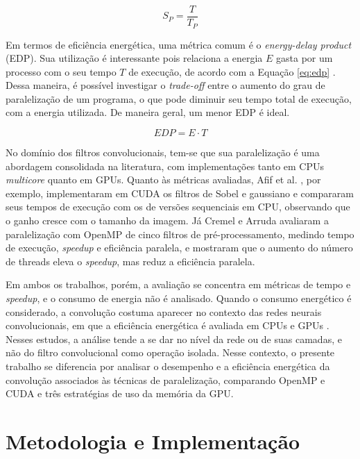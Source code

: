 \documentclass[12pt]{article}
\begin{document}
\begin{equation}
  \label{eq:speedup}
  S_P=\frac{T}{T_P}
\end{equation}

Em termos de eficiência energética, uma métrica comum é o \textit{energy-delay product} (EDP). Sua utilização é interessante pois relaciona a energia $E$ gasta por um processo com o seu tempo $T$ de execução, de acordo com a Equação \ref{eq:edp} \cite{fratin2018}. Dessa maneira, é possível investigar o \textit{trade-off} entre o aumento do grau de paralelização de um programa, o que pode diminuir seu tempo total de execução, com a energia utilizada. De maneira geral, um menor EDP é ideal.

\begin{equation}
  \label{eq:edp}
  EDP = E \cdot T
\end{equation}

No domínio dos filtros convolucionais, tem-se que sua paralelização é uma abordagem consolidada na literatura, com implementações tanto em CPUs \emph{multicore} quanto em GPUs. Quanto às métricas avaliadas, Afif et al. \cite{Afif-Cuda}, por exemplo, implementaram em CUDA os filtros de Sobel e gaussiano e compararam seus tempos de execução com os de versões sequenciais em CPU, observando que o ganho cresce com o tamanho da imagem. Já Cremel e Arruda \cite{Cremel-OpenMP} avaliaram a paralelização com OpenMP de cinco filtros de pré-processamento, medindo tempo de execução, \emph{speedup} e eficiência paralela, e mostraram que o aumento do número de threads eleva o \emph{speedup}, mas reduz a eficiência paralela.

Em ambos os trabalhos, porém, a avaliação se concentra em métricas de tempo e \emph{speedup}, e o consumo de energia não é analisado. Quando o consumo energético é considerado, a convolução costuma aparecer no contexto das redes neurais convolucionais, em que a eficiência energética é avaliada em CPUs e GPUs \cite{xu2023, li2016}. Nesses estudos, a análise tende a se dar no nível da rede ou de suas camadas, e não do filtro convolucional como operação isolada. Nesse contexto, o presente trabalho se diferencia por analisar o desempenho e a eficiência energética da convolução associados às técnicas de paralelização, comparando OpenMP e CUDA e três estratégias de uso da memória da GPU.
\section{Metodologia e Implementação}
\end{document}
